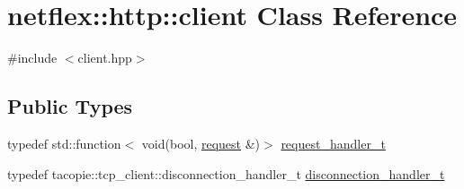 \hypertarget{classnetflex_1_1http_1_1client}{}\section{netflex\+:\+:http\+:\+:client Class Reference}
\label{classnetflex_1_1http_1_1client}


{\ttfamily \#include $<$client.\+hpp$>$}

\subsection*{Public Types}
\begin{DoxyCompactItemize}
\item 
typedef std\+::function$<$ void(bool, \hyperlink{classnetflex_1_1http_1_1request}{request} \&)$>$ \hyperlink{classnetflex_1_1http_1_1client_aeac22a78222d25d3224bf50b8e44fb2d}{request\+\_\+handler\+\_\+t}
\item 
typedef tacopie\+::tcp\+\_\+client\+::disconnection\+\_\+handler\+\_\+t \hyperlink{classnetflex_1_1http_1_1client_acacb8798dcade63c52a674b3f7820fba}{disconnection\+\_\+handler\+\_\+t}
\end{DoxyCompactItemize}
